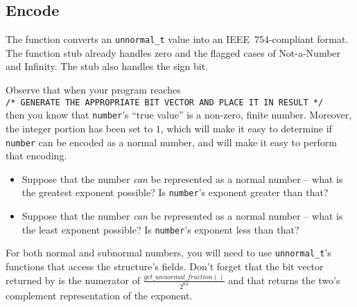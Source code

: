 \subsection*{Encode}

The  function converts an \lstinline{unnormal_t} value into an IEEE~754-compliant format.
The function stub already handles zero and the flagged cases of Not-a-Number and Infinity.
The stub also handles the sign bit.

Observe that when your program reaches \\
\lstinline{/* GENERATE THE APPROPRIATE BIT VECTOR AND PLACE IT IN RESULT */} \\
then you know that \lstinline{number}'s ``true value'' is a non-zero, finite number.
Moreover, the integer portion has been set to $1$, which will make it easy to determine if \lstinline{number} can be encoded as a normal number,
and will make it easy to perform that encoding.

\begin{description}
    \begin{itemize}
        \item Suppose that the number \textit{can} be represented as a normal number -- what is the greatest exponent possible?
        Is \lstinline{number}'s exponent greater than that?
    \end{itemize}
    \begin{itemize}
        \item Suppose that the number \textit{can} be represented as a normal number -- what is the least exponent possible?
            Is \lstinline{number}'s exponent less than that?
    \end{itemize}
\end{description}
For both normal and subnormal numbers, you will need to use \lstinline{unnormal_t}'s functions that access the structure's fields.
Don't forget that the bit vector returned by  is the numerator of $\frac{get\_unnormal\_fraction()}{2^{64}}$ and that  returns the two's complement representation of the exponent.

